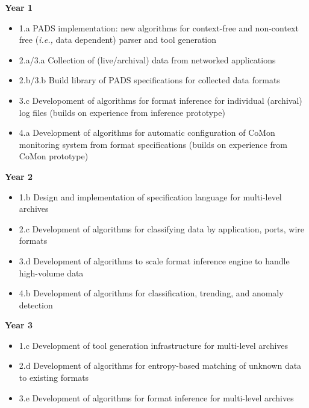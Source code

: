 

\noindent
{\bf Year 1}
\begin{itemize}
\item 1.a PADS implementation: new algorithms for context-free and non-context
free ({\em i.e.,} data dependent) parser and tool generation 
\item 2.a/3.a Collection of (live/archival) data from networked applications
\item 2.b/3.b Build library of PADS specifications for collected data formats
\item 3.c Developoment of algorithms for format inference for individual
(archival) log files
(builds on experience from inference prototype)
\item 4.a Development of algorithms for automatic configuration of CoMon monitoring system 
from format specifications (builds on experience from CoMon prototype)
\end{itemize}

\noindent
{\bf Year 2}
\begin{itemize}
\item 1.b Design and implementation of specification language for multi-level archives
\item 2.c Development of algorithms for classifying data by application, ports, wire formats
\item 3.d Development of algorithms to scale format inference engine to handle high-volume 
data
\item 4.b Development of algorithms for classification, trending, and 
anomaly detection
\end{itemize}

\noindent
{\bf Year 3}
\begin{itemize}
\item 1.c Development of tool generation infrastructure for multi-level archives
\item 2.d Development of algorithms for entropy-based matching of unknown data to existing formats
\item 3.e Development of algorithms for format inference for multi-level archives
\end{itemize}


